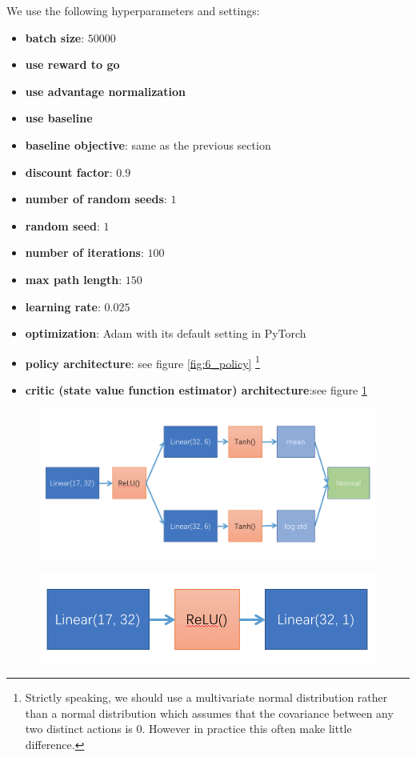 \documentclass[a4paper]{article}
\theoremstyle{definition}
\begin{document}
We use the following hyperparameters and settings:
\begin{itemize}
\item \textbf{batch size}: $50000$
\item \textbf{use reward to go}
\item \textbf{use advantage normalization}
\item \textbf{use baseline}
\item \textbf{baseline objective}: same as the previous section 
\item \textbf{discount factor}: $0.9$
\item \textbf{number of random seeds}: $1$
\item \textbf{random seed}: $1$
\item \textbf{number of iterations}: $100$
\item \textbf{max path length}: $150$
\item \textbf{learning rate}: $0.025$
\item \textbf{optimization}: Adam with its default setting in PyTorch
\item \textbf{policy architecture}: see figure \ref{fig:6_policy} \footnote{Strictly speaking, we should use a multivariate normal distribution rather than a normal distribution which assumes that the covariance between any two distinct actions is $0$. However in practice this often make little difference.}
\item \textbf{critic (state value function estimator) architecture}:see figure \ref{fig:6_value}
\end{itemize}

\begin{figure}[H]
\centering
\begin{minipage}{.45\textwidth}
  \centering
  \includegraphics[width=\linewidth]{figures/6_policy.png}
  \label{fig:6_policy}
\end{minipage}%
\hfill
\begin{minipage}{.45\textwidth}
  \centering
\includegraphics[width=\linewidth]{figures/6_value.png}
\label{fig:6_value}
\end{minipage}
\end{figure}
\end{document}
